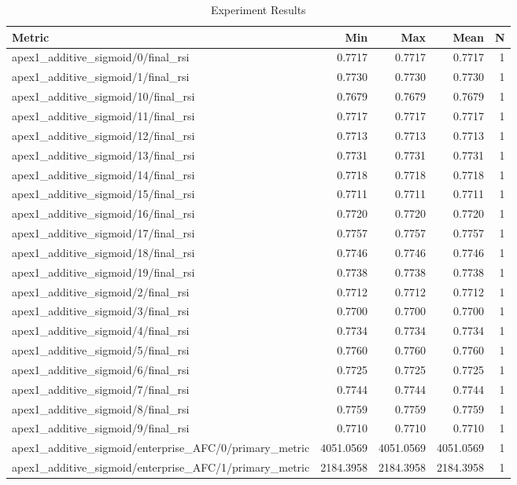 \begin{table}[h]
\centering
\caption{Experiment Results}
\begin{tabular}{lrrrr}
\hline
Metric & Min & Max & Mean & N \\
\hline
apex1_additive_sigmoid/0/final_rsi & 0.7717 & 0.7717 & 0.7717 & 1 \\
apex1_additive_sigmoid/1/final_rsi & 0.7730 & 0.7730 & 0.7730 & 1 \\
apex1_additive_sigmoid/10/final_rsi & 0.7679 & 0.7679 & 0.7679 & 1 \\
apex1_additive_sigmoid/11/final_rsi & 0.7717 & 0.7717 & 0.7717 & 1 \\
apex1_additive_sigmoid/12/final_rsi & 0.7713 & 0.7713 & 0.7713 & 1 \\
apex1_additive_sigmoid/13/final_rsi & 0.7731 & 0.7731 & 0.7731 & 1 \\
apex1_additive_sigmoid/14/final_rsi & 0.7718 & 0.7718 & 0.7718 & 1 \\
apex1_additive_sigmoid/15/final_rsi & 0.7711 & 0.7711 & 0.7711 & 1 \\
apex1_additive_sigmoid/16/final_rsi & 0.7720 & 0.7720 & 0.7720 & 1 \\
apex1_additive_sigmoid/17/final_rsi & 0.7757 & 0.7757 & 0.7757 & 1 \\
apex1_additive_sigmoid/18/final_rsi & 0.7746 & 0.7746 & 0.7746 & 1 \\
apex1_additive_sigmoid/19/final_rsi & 0.7738 & 0.7738 & 0.7738 & 1 \\
apex1_additive_sigmoid/2/final_rsi & 0.7712 & 0.7712 & 0.7712 & 1 \\
apex1_additive_sigmoid/3/final_rsi & 0.7700 & 0.7700 & 0.7700 & 1 \\
apex1_additive_sigmoid/4/final_rsi & 0.7734 & 0.7734 & 0.7734 & 1 \\
apex1_additive_sigmoid/5/final_rsi & 0.7760 & 0.7760 & 0.7760 & 1 \\
apex1_additive_sigmoid/6/final_rsi & 0.7725 & 0.7725 & 0.7725 & 1 \\
apex1_additive_sigmoid/7/final_rsi & 0.7744 & 0.7744 & 0.7744 & 1 \\
apex1_additive_sigmoid/8/final_rsi & 0.7759 & 0.7759 & 0.7759 & 1 \\
apex1_additive_sigmoid/9/final_rsi & 0.7710 & 0.7710 & 0.7710 & 1 \\
apex1_additive_sigmoid/enterprise_AFC/0/primary_metric & 4051.0569 & 4051.0569 & 4051.0569 & 1 \\
apex1_additive_sigmoid/enterprise_AFC/1/primary_metric & 2184.3958 & 2184.3958 & 2184.3958 & 1 \\

\end{tabular}
\end{table}
